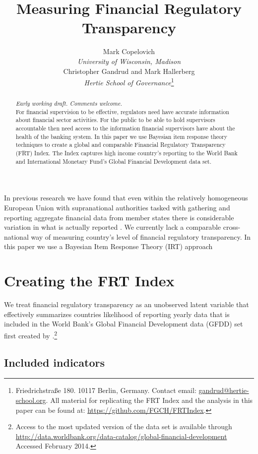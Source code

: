 \documentclass[a4paper]{article}
\title{Measuring Financial Regulatory Transparency}
\author{Mark Copelovich \\ \emph{University of Wisconsin, Madison} \\[0.5cm] Christopher Gandrud and Mark Hallerberg \\ 
    {\emph{Hertie School of Governance}}\footnote{Friedrichstra{\ss}e 180. 10117 Berlin, Germany. Contact email: \href{mailto:gandrud@hertie-school.org}{gandrud@hertie-school.org}. All material for replicating the FRT Index and the analysis in this paper can be found at: \url{https://github.com/FGCH/FRTIndex}.}}
\begin{document}
\maketitle

\begin{abstract}
\noindent \emph{Early working draft. Comments welcome.} \\
For financial supervision to be effective, regulators need have accurate information about financial sector activities. For the public to be able to hold supervisors accountable then need access to the information financial supervisors have about the health of the banking system. In this paper we use Bayesian item response theory techniques to create a global and comparable Financial Regulatory Transparency (FRT) Index. The Index captures high income country's reporting to the World Bank and International Monetary Fund's Global Financial Development data set. 
\end{abstract}

In previous research we have found that even within the relatively homogeneous European Union with supranational authorities tasked with gathering and reporting aggregate financial data from member states there is considerable variation in what is actually reported \cite[see][]{Gandrud2014a}. We currently lack a comparable cross-national way of measuring country's level of financial regulatory transparency. In this paper we use a Bayesian Item Response Theory (IRT) approach

\section{Creating the FRT Index}

We treat financial regulatory transparency as an unobserved latent variable that effectively summarizes countries likelihood of reporting yearly data that is included in the World Bank's Global Financial Development data (GFDD) set first created by \cite{Cihak2012}.\footnote{Access to the most updated version of the data set is available through \url{http://data.worldbank.org/data-catalog/global-financial-development} Accessed February 2014.}

\subsection{Included indicators}
\end{document}
